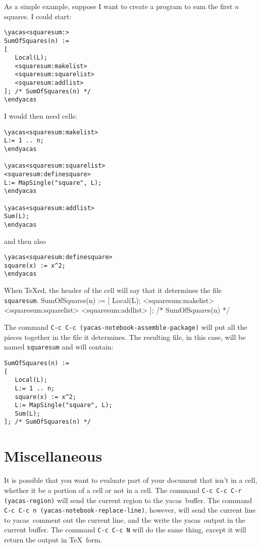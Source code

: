 \documentclass[12pt]{article}
\def\ys{\textsf{yacas}}
\begin{document}
As a simple example, suppose I want to create a program to sum the
first $n$ squares.  I could start:
\newpage
\begin{verbatim}
\yacas<squaresum:>
SumOfSquares(n) :=
[
   Local(L);
   <squaresum:makelist>
   <squaresum:squarelist>
   <squaresum:addlist>
]; /* SumOfSquares(n) */
\endyacas
\end{verbatim}
I would then need cells:
\begin{verbatim}
\yacas<squaresum:makelist>
L:= 1 .. n;
\endyacas

\yacas<squaresum:squarelist>
<squaresum:definesquare>
L:= MapSingle("square", L);
\endyacas

\yacas<squaresum:addlist>
Sum(L);
\endyacas
\end{verbatim}
and then also
\begin{verbatim}
\yacas<squaresum:definesquare>
square(x) := x^2;
\endyacas
\end{verbatim}

\newpage

When \TeX{}ed, the header of the cell will say that it determines the
file \texttt{squaresum}.
SumOfSquares(n) :=
[
   Local(L);
   <squaresum:makelist>
   <squaresum:squarelist>
   <squaresum:addlist>
]; /* SumOfSquares(n) */
\endyacas

The command \texttt{C-c C-c (yacas-notebook-assemble-package)} will put all
the pieces together in the file it determines.  The resulting file, in
this case, will be named \texttt{squaresum} and will contain:
\begin{verbatim}
SumOfSquares(n) :=
[
   Local(L);
   L:= 1 .. n;
   square(x) := x^2;
   L:= MapSingle("square", L);
   Sum(L);
]; /* SumOfSquares(n) */
\end{verbatim}

\section{Miscellaneous}

It is possible that you want to evaluate part of your document that
isn't in a cell, whether it be a portion of a cell or not in a cell.
The command \texttt{C-c C-c C-r (yacas-region)} will send the current
region to the \ys\ buffer.  The command \texttt{C-c C-c n
  (yacas-notebook-replace-line)}, however, will send the current line to \ys\,
comment out the current line, and the write the \ys\ output in the
current buffer.  The command \texttt{C-c C-c N} will do the same
thing, except it will return the output in \TeX\ form.
\end{document}
